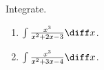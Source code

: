 Integrate.
\begin{enumerate}
\item $\int \frac{x^3}{x^2+2x-3}\diff x$.
\item $\int \frac{x^3}{x^2+3x-4}\diff x$.

\end{enumerate}